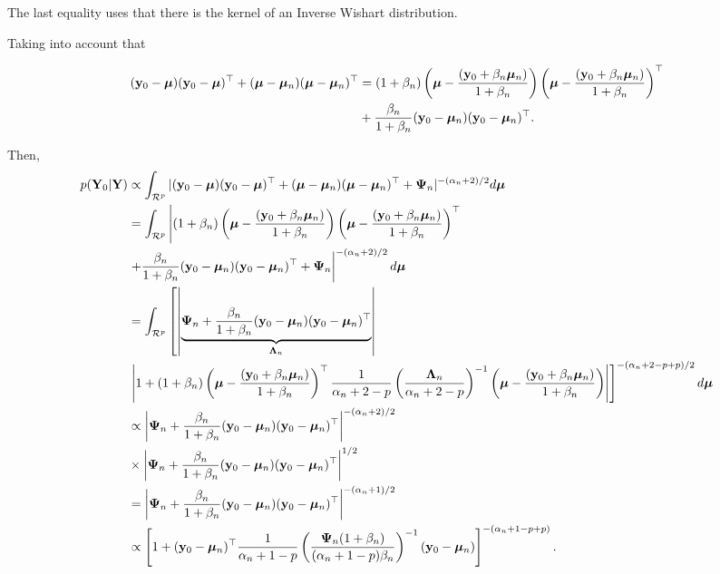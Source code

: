 \begin{enumerate}[leftmargin=*]
The last equality uses that there is the kernel of an Inverse Wishart distribution.

Taking into account that

{\scriptsize{
\begin{align*}
	({\bf{y}}_0-\bm{\mu})({\bf{y}}_0-\bm{\mu})^{\top}+(\bm{\mu}-\bm{\mu}_n)(\bm{\mu}-\bm{\mu}_n)^{\top} & = (1+\beta_n)\left(\bm{\mu}-\frac{({\bf{y}}_0+\beta_n\bm{\mu}_n)}{1+\beta_n}\right)\left(\bm{\mu}-\frac{({\bf{y}}_0+\beta_n\bm{\mu}_n)}{1+\beta_n}\right)^{\top}\\
	&+\frac{\beta_n}{1+\beta_n}({\bf{y}}_0-\bm{\mu}_n)({\bf{y}}_0-\bm{\mu}_n)^{\top}.
\end{align*}
}}

Then,
{\scriptsize{
\begin{align*}
	p({\bf{Y}}_0|{\bf{Y}})&\propto\int_{\mathcal{R}^p}|({\bf{y}}_0-\bm{\mu})({\bf{y}}_0-\bm{\mu})^{\top}+(\bm{\mu}-\bm{\mu}_n)(\bm{\mu}-\bm{\mu}_n)^{\top}+\mathbf{\Psi}_n|^{-(\alpha_n+2)/2}d\bm{\mu}\\
	&=\int_{\mathcal{R}^p}\left\vert(1+\beta_n)\left(\bm{\mu}-\frac{({\bf{y}}_0+\beta_n\bm{\mu}_n)}{1+\beta_n}\right)\left(\bm{\mu}-\frac{({\bf{y}}_0+\beta_n\bm{\mu}_n)}{1+\beta_n}\right)^{\top}\right.\\
	&\left.+\frac{\beta_n}{1+\beta_n}({\bf{y}}_0-\bm{\mu}_n)({\bf{y}}_0-\bm{\mu}_n)^{\top}+\mathbf{\Psi}_n\right\vert^{-(\alpha_n+2)/2}d\bm{\mu}\\
	&=\int_{\mathcal{R}^p}\left[\left\vert\underbrace{\mathbf{\Psi}_n+\frac{\beta_n}{1+\beta_n}({\bf{y}}_0-\bm{\mu}_n)({\bf{y}}_0-\bm{\mu}_n)^{\top}}_{\mathbf{\Lambda}_n}\right\vert\right.\\
	&\left.\left\vert 1+(1+\beta_n)\left(\bm{\mu}-\frac{({\bf{y}}_0+\beta_n\bm{\mu}_n)}{1+\beta_n}\right)^{\top}\frac{1}{\alpha_n+2-p}\left(\frac{\mathbf{\Lambda}_n}{\alpha_n+2-p}\right)^{-1}\left(\bm{\mu}-\frac{({\bf{y}}_0+\beta_n\bm{\mu}_n)}{1+\beta_n}\right)\right\vert\right]^{-(\alpha_n+2-p+p)/2}d\bm{\mu}\\
	&\propto \left\vert\mathbf{\Psi}_n+\frac{\beta_n}{1+\beta_n}({\bf{y}}_0-\bm{\mu}_n)({\bf{y}}_0-\bm{\mu}_n)^{\top}\right\vert^{-(\alpha_n+2)/2}\\
	&\times \left\vert\mathbf{\Psi}_n+\frac{\beta_n}{1+\beta_n}({\bf{y}}_0-\bm{\mu}_n)({\bf{y}}_0-\bm{\mu}_n)^{\top}\right\vert^{1/2}\\
	&=\left\vert\mathbf{\Psi}_n+\frac{\beta_n}{1+\beta_n}({\bf{y}}_0-\bm{\mu}_n)({\bf{y}}_0-\bm{\mu}_n)^{\top}\right\vert^{-(\alpha_n+1)/2}\\
	&\propto \left[1+({\bf{y}}_0-\bm{\mu}_n)^{\top}\frac{1}{\alpha_n+1-p}\left(\frac{\mathbf{\Psi}_n(1+\beta_n)}{(\alpha_n+1-p)\beta_n}\right)^{-1}({\bf{y}}_0-\bm{\mu}_n)\right]^{-(\alpha_n+1-p+p)}. 
\end{align*} 
}}


\end{enumerate}
